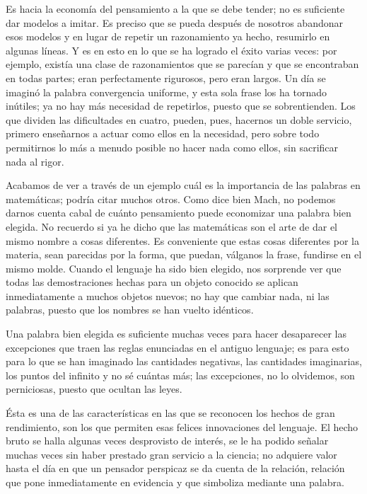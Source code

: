 \documentclass[a4paper, 12pt]{article}
\begin{document}
Es hacia la economía del pensamiento a la que se debe tender; no es
suficiente dar modelos a imitar. Es preciso que se pueda después de
nosotros abandonar esos modelos y en lugar de repetir un razonamiento ya
hecho, resumirlo en algunas líneas. Y es en esto en lo que se ha
logrado el éxito varias veces: por ejemplo, existía una clase de
razonamientos que se parecían y que se encontraban en todas partes;
eran perfectamente rigurosos, pero eran largos. Un día se imaginó
la palabra convergencia uniforme, y esta sola frase los ha tornado
inútiles; ya no hay más necesidad de repetirlos, puesto que se
sobrentienden. Los que dividen las dificultades en cuatro, pueden, pues,
hacernos un doble servicio, primero enseñarnos a actuar como ellos en la
necesidad, pero sobre todo permitirnos lo más a menudo posible no hacer
nada como ellos, sin sacrificar nada al rigor.

Acabamos de ver a través de un ejemplo cuál es la importancia de las
palabras en matemáticas; podría citar muchos otros. Como dice bien
Mach, no podemos darnos cuenta cabal de cuánto pensamiento puede
economizar una palabra bien elegida. No recuerdo si ya he dicho que las matemáticas son el arte de dar el mismo nombre a cosas diferentes. Es conveniente que
estas cosas diferentes por la materia, sean parecidas por la forma, que
puedan, válganos la frase, fundirse en el mismo molde. Cuando el
lenguaje ha sido bien elegido, nos sorprende ver que todas las
demostraciones hechas para un objeto conocido se aplican inmediatamente a
muchos objetos nuevos; no hay que cambiar nada, ni las palabras, puesto que
los nombres se han vuelto idénticos.

Una palabra bien elegida es suficiente muchas veces para hacer desaparecer
las excepciones que traen las reglas enunciadas en el antiguo lenguaje; es
para esto para lo que se han imaginado las cantidades negativas, las
cantidades imaginarias, los puntos del infinito y no sé cuántas más; las excepciones, no lo olvidemos, son perniciosas, puesto que
ocultan las leyes.

Ésta es una de las características en las que se reconocen los
hechos de gran rendimiento, son los que permiten esas felices innovaciones
del lenguaje. El hecho bruto se halla algunas veces desprovisto de interés, se le ha podido señalar muchas veces sin haber prestado gran servicio
a la ciencia; no adquiere valor hasta el día en que un pensador
perspicaz se da cuenta de la relación, relación que pone
inmediatamente en evidencia y que simboliza mediante una palabra.
\end{document}
